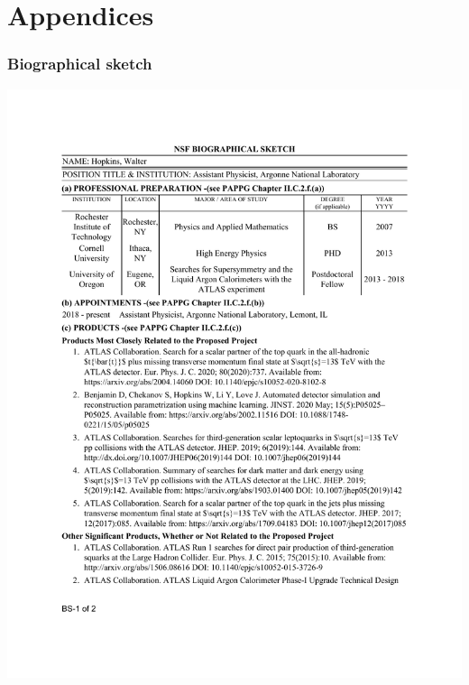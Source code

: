 \documentclass[letter, USenglish, 11pt, subfigure]{article}
\begin{document}
\clearpage

\appendix
\part*{Appendices}
\section{Biographical sketch}
\centerline{\includegraphics[width=0.99\paperwidth,trim=0 1.73in 0 1.06in,clip]{bioSketch.pdf}}


\clearpage

% 
% 
\end{document}
